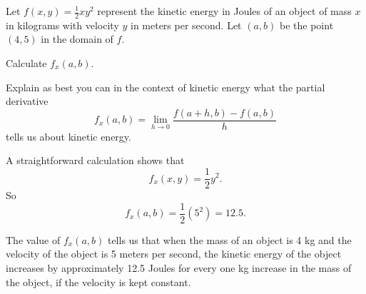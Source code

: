 \begin{activity} \label{A:10.2.5} Let $f(x,y) = \frac{1}{2}xy^2$ represent the kinetic energy in Joules of an object of mass $x$ in kilograms with velocity $y$ in meters per second. Let $(a,b)$ be the point $(4,5)$ in the domain of $f$.
    \ba
    \item Calculate $f_x(a,b)$.



    \item Explain as best you can in the context of kinetic energy what the partial derivative
\[f_x(a,b) = \lim_{h \to 0} \frac{f(a+h,b) - f(a,b)}{h}\]
tells us about kinetic energy.

    \ea

\end{activity}
\begin{smallhint}

\end{smallhint}
\begin{bighint}

\end{bighint}
\begin{activitySolution}
    \ba
    \item A straightforward calculation shows that 
\[f_x(x,y) = \frac{1}{2}y^2.\]
So 
\[f_x(a,b) = \frac{1}{2}(5^2) = 12.5.\]

    \item The value of $f_x(a,b)$ tells us that when the mass of an object is 4 kg and the velocity of the object is 5 meters per second, the kinetic energy of the object increases by approximately 12.5 Joules for every one kg increase in the mass of the object, if the velocity is kept constant. 

    \ea
\end{activitySolution}
\aftera
